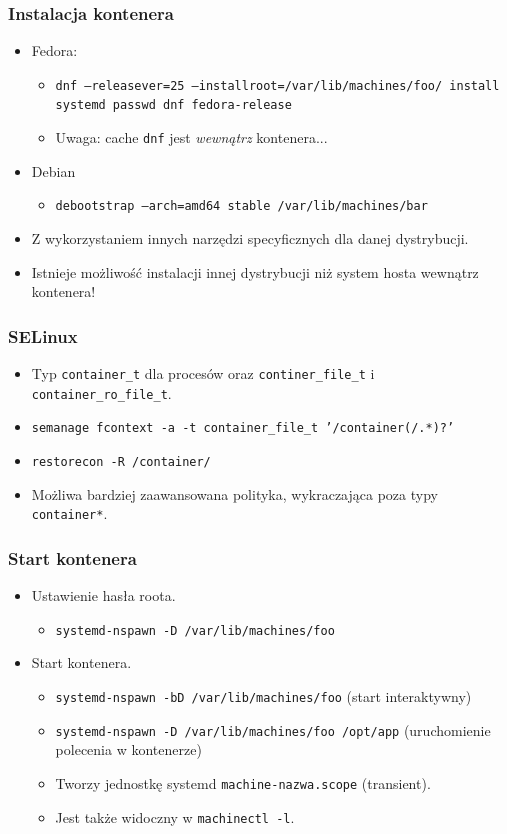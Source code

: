\documentclass[dvipsnames,table]{beamer}
\begin{document}
\begin{frame}
\frametitle{Instalacja kontenera}
\begin{itemize}
	\item Fedora: 
	\begin{itemize}
		\item {\tt dnf --releasever=25 --installroot=/var/lib/machines/foo/ install systemd passwd dnf fedora-release}
		\item Uwaga: cache {\tt dnf} jest {\it wewnątrz} kontenera... 
	\end{itemize}
	\item Debian
	\begin{itemize}
		\item {\tt debootstrap --arch=amd64 stable /var/lib/machines/bar}
	\end{itemize}
	\item Z wykorzystaniem innych narzędzi specyficznych dla danej dystrybucji.
	\item Istnieje możliwość instalacji innej dystrybucji niż system hosta wewnątrz kontenera!
\end{itemize}
\end{frame}

\begin{frame}
\frametitle{SELinux}
\begin{itemize}
	\item Typ {\tt container\_t} dla procesów oraz {\tt continer\_file\_t} i {\tt container\_ro\_file\_t}.
	\item {\tt semanage fcontext -a -t container\_file\_t '/container(/.*)?'}
	\item {\tt restorecon -R /container/}
	\item Możliwa bardziej zaawansowana polityka, wykraczająca poza typy {\tt container*}.
\end{itemize}	
\end{frame}

\begin{frame}
\frametitle{Start kontenera}
\begin{itemize}
	\item Ustawienie hasła roota.
	\begin{itemize}
		\item {\tt systemd-nspawn -D /var/lib/machines/foo}
	\end{itemize}
	\item Start kontenera.
	\begin{itemize}
		\item {\tt systemd-nspawn -bD /var/lib/machines/foo} (start interaktywny)
		\item {\tt systemd-nspawn -D /var/lib/machines/foo /opt/app} (uruchomienie polecenia w kontenerze)
		\item Tworzy jednostkę systemd {\tt machine-nazwa.scope} (transient).
		\item Jest także widoczny w {\tt machinectl -l}.
	\end{itemize}	
\end{itemize}
\end{frame}
\end{document}
